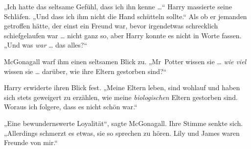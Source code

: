 „Ich hatte das seltsame Gefühl, dass ich ihn kenne …“ Harry massierte seine Schläfen.
„Und dass ich ihm nicht die Hand schütteln sollte.“ Als ob er jemanden getroffen hätte, der einst ein Freund war, bevor irgendetwas schrecklich schiefgelaufen war … nicht ganz so, aber Harry konnte es nicht in Worte fassen.
„Und was \emph{war} … das alles?“

McGonagall warf ihm einen seltsamen Blick zu.
„Mr~Potter wissen sie … \emph{wie viel} wissen sie … darüber, wie ihre Eltern gestorben sind?“

Harry erwiderte ihren Blick fest.
„Meine Eltern leben, sind wohlauf und haben sich stets geweigert zu erzählen, wie meine \emph{biologischen} Eltern gestorben sind. Woraus ich folgere, dass es nicht schön war.“

„Eine bewundernswerte Loyalität“, sagte McGonagall. Ihre Stimme senkte sich.
„Allerdings schmerzt es etwas, sie so sprechen zu hören. Lily und James waren Freunde von mir.“

